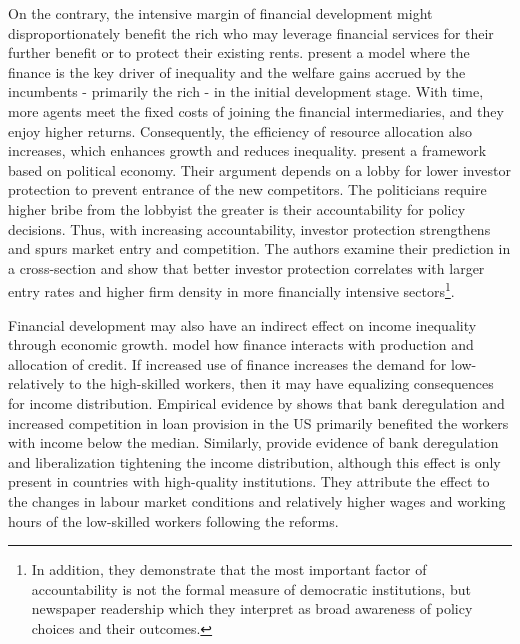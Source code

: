 \begin{refsection}
On the contrary, the intensive margin of financial development might disproportionately benefit the rich who may leverage financial services for their further benefit or to protect their existing rents. \textcite{GreenwoodJovanovic1990} present a model where the finance is the key driver of inequality and the welfare gains accrued by the incumbents - primarily the rich - in the initial development stage. With time, more agents meet the fixed costs of joining the financial intermediaries, and they enjoy higher returns. Consequently, the efficiency of resource allocation also increases, which enhances growth and reduces inequality. \textcite{perotti2007investor} present a framework based on political economy. Their argument depends on a lobby for lower investor protection to prevent entrance of the new competitors. The politicians require higher bribe from the lobbyist the greater is their accountability for policy decisions. Thus, with increasing accountability, investor protection strengthens and spurs market entry and competition. The authors examine their prediction in a cross-section and show that better investor protection correlates with larger entry rates and higher firm density in more financially intensive sectors\footnote{In addition, they demonstrate that the most important factor of accountability is not the formal measure of democratic institutions, but newspaper readership which they interpret as broad awareness of policy choices and their outcomes.}. 

Financial development may also have an indirect effect on income inequality through economic growth. \textcite{townsendeueda2006} model how finance interacts with production and allocation of credit. If increased use of finance increases the demand for low- relatively to the high-skilled workers, then it may have equalizing consequences for income distribution. Empirical evidence by \textcite{beck2010big} shows that bank deregulation and increased competition in loan provision in the US primarily benefited the workers with income below the median. Similarly, \textcite{delis2014} provide evidence of bank deregulation and liberalization tightening the income distribution, although this effect is only present in countries with high-quality institutions. They attribute the effect to the changes in labour market conditions and relatively higher wages and working hours of the low-skilled workers following the reforms. 


\end{refsection}
